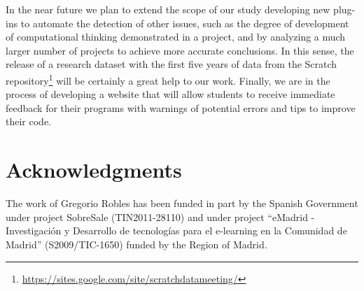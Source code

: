 \documentclass[conference]{format/IEEEtran}
\begin{document}

In the near future we plan to extend the scope of our study developing new plug-ins to automate the detection of other issues, such as the degree of development of computational thinking demonstrated in a project, and by analyzing a much larger number of projects to achieve more accurate conclusions. In this sense, the release of a research dataset with the first five years of data from the Scratch repository\footnote{\url{https://sites.google.com/site/scratchdatameeting/}} will be certainly a great help to our work. Finally, we are in the process of developing a website that will allow students to receive immediate feedback for their programs with warnings of potential errors and tips to improve their code.

\section*{Acknowledgments}

The work of Gregorio Robles has
been funded in part by the Spanish Government under project 
SobreSale (TIN2011-28110) and under project ``eMadrid - Investigación y Desarrollo de tecnologías para el e-learning en la Comunidad de Madrid'' (S2009/TIC-1650) funded by the Region of Madrid.



\end{document}
